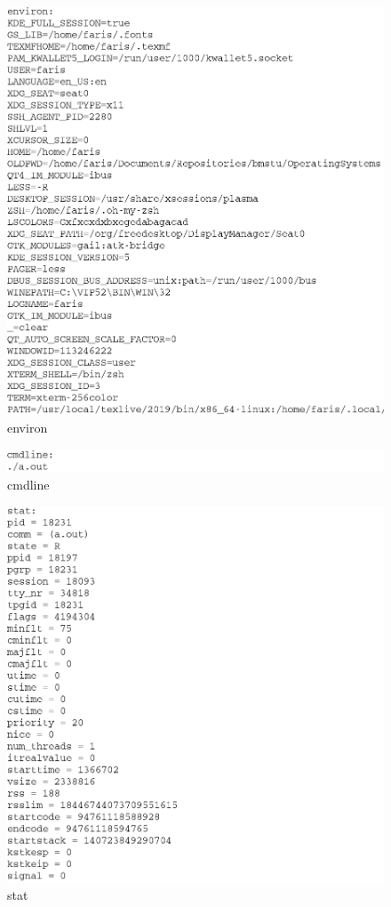 \begin{figure}[H]
    \includegraphics[scale=0.5]{images/environ.png}
    \caption{environ}\label{img:environ}
\end{figure}

\begin{figure}[H]
    \includegraphics[scale=0.5]{images/cmdline.png}
    \caption{cmdline}\label{img:cmdline}
\end{figure}

\begin{figure}[H]
    \includegraphics[scale=0.5]{images/stat.png}
    \caption{stat}\label{img:stat}
\end{figure}

